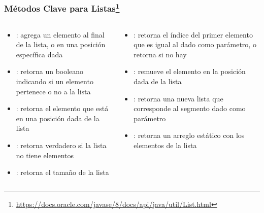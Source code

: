 \documentclass{beamer}
\begin{document}
\begin{frame}[fragile]
  \frametitle{Métodos Clave para Listas\footnote{\url{https://docs.oracle.com/javase/8/docs/api/java/util/List.html}}}

  \begin{columns}
    \begin{column}{0.5\textwidth}
      \begin{footnotesize}
        \begin{itemize}
        \item {}: agrega un elemento al final de la lista, o
          en una posición específica dada
          
        \item {}: retorna un booleano indicando si un
          elemento pertenece o no a la lista
          
        \item {}: retorna el elemento que está en una posición
          dada de la lista
          
        \item {}: retorna verdadero si la lista no tiene
          elementos
          
        \item {}: retorna el tamaño de la lista
          
        \end{itemize}
      \end{footnotesize}
    \end{column}
    \begin{column}{0.5\textwidth}
      \begin{footnotesize}
      \begin{itemize}
        \item {}: retorna el índice del primer elemento
          que es igual al dado como parámetro, o retorna  si
          no hay
          
        \item {}: remueve el elemento en la posición dada
          de la lista
          
        \item {}: retorna una nueva lista que corresponde
          al segmento dado como parámetro
          
        \item {}: retorna un arreglo estático con los
          elementos de la lista
          
        \end{itemize}
       \end{footnotesize}
    \end{column}
  \end{columns}

\end{frame}
\end{document}
